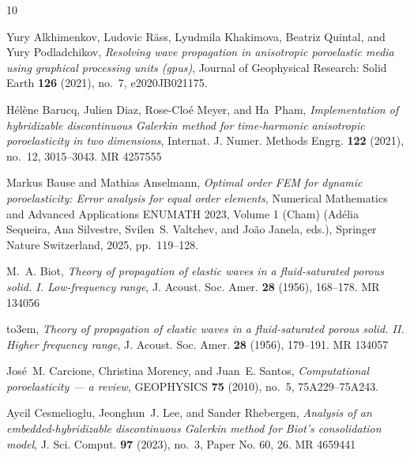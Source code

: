 \documentclass[10pt,letterpaper]{amsart}
\theoremstyle{plain} %
\theoremstyle{remark} %
\begin{document}
% 
%
\providecommand{\bysame}{\leavevmode\hbox to3em{\hrulefill}\thinspace}
\providecommand{\MR}{\relax\ifhmode\unskip\space\fi MR }
\providecommand{\MRhref}[2]{%
  \href{http://www.ams.org/mathscinet-getitem?mr=#1}{#2}
}
\providecommand{\href}[2]{#2}
\begin{thebibliography}{10}

Yury Alkhimenkov, Ludovic Räss, Lyudmila Khakimova, Beatriz Quintal, and Yury
  Podladchikov, \emph{Resolving wave propagation in anisotropic poroelastic
  media using graphical processing units (gpus)}, Journal of Geophysical
  Research: Solid Earth \textbf{126} (2021), no.~7, e2020JB021175.

H\'el\`ene Barucq, Julien Diaz, Rose-Clo\'e{} Meyer, and Ha~Pham,
  \emph{Implementation of hybridizable discontinuous {G}alerkin method for
  time-harmonic anisotropic poroelasticity in two dimensions}, Internat. J.
  Numer. Methods Engrg. \textbf{122} (2021), no.~12, 3015--3043. \MR{4257555}

Markus Bause and Mathias Anselmann, \emph{Optimal order {FEM} for dynamic
  poroelasticity: Error analysis for equal order elements}, Numerical
  Mathematics and Advanced Applications ENUMATH 2023, Volume 1 (Cham)
  (Ad{\'e}lia Sequeira, Ana Silvestre, Svilen~S. Valtchev, and Jo{\~a}o Janela,
  eds.), Springer Nature Switzerland, 2025, pp.~119--128.

M.~A. Biot, \emph{Theory of propagation of elastic waves in a fluid-saturated
  porous solid. {I}. {L}ow-frequency range}, J. Acoust. Soc. Amer. \textbf{28}
  (1956), 168--178. \MR{134056}

\bysame, \emph{Theory of propagation of elastic waves in a fluid-saturated
  porous solid. {II}. {H}igher frequency range}, J. Acoust. Soc. Amer.
  \textbf{28} (1956), 179--191. \MR{134057}

José~M. Carcione, Christina Morency, and Juan~E. Santos, \emph{Computational
  poroelasticity — a review}, GEOPHYSICS \textbf{75} (2010), no.~5,
  75A229--75A243.

Aycil Cesmelioglu, Jeonghun~J. Lee, and Sander Rhebergen, \emph{Analysis of an
  embedded-hybridizable discontinuous {G}alerkin method for {B}iot's
  consolidation model}, J. Sci. Comput. \textbf{97} (2023), no.~3, Paper No.
  60, 26. \MR{4659441}


\end{thebibliography}
\end{document}
